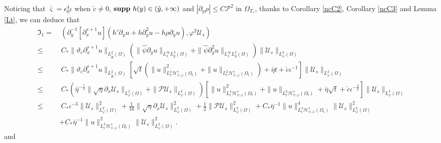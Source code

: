 \documentclass{amsart}
\numberwithin{equation}{section}
\begin{document}
Noticing that $\bar{\varsigma}=\epsilon_{0}^{4}\iota$ when $\check{c}\neq0$, ${\bf supp}~h(y)\in(\hat{y},+\infty)$ and $|\partial_{y}\rho|\leq C\mathcal{P}^{2}$  in $\Omega_{T_{*}}$, thanks to Corollary \ref{ncC2}, Corollary \ref{ncC3} and Lemma \ref{Lt}, we can deduce that
\begin{align*}
\mathfrak{I}_{1}
=&~(\partial_{y}^{-1}[\partial_{x}^{s+1}u](h'\partial_{y}u+h\partial_{y}^{2}u-h\rho\partial_{y}u),\varphi^{2}\mathcal{U}_{s})\\
\leq&~C_{*}\|\vartheta_{c}\partial_{x}^{s+1}u\|_{L_{\hat{\Psi}}^{2}(\Omega)}
           (\|\hat{\psi}\partial_{y}u\|_{L_{x}^{\infty}L_{y}^{2}(\Omega)}+\|\hat{\psi}\partial_{y}^{2}u\|_{L_{x}^{\infty}L_{y}^{2}(\Omega)})
           \|\mathcal{U}_{s}\|_{L_{\varphi}^{2}(\Omega)}\\
\leq&~C_{*}\|\vartheta_{c}\partial_{x}^{s+1}u\|_{L_{\hat{\Psi}}^{2}(\Omega)}
           \left[\sqrt{t}\left(\|u\|_{L_{t}^{4}\mathcal{H}_{\psi,\varphi}^{s}(\Omega_{t})}^{2}+\|u\|_{L_{t}^{2}\mathcal{H}_{\psi,\varphi}^{s}(\Omega_{t})}\right)
                 +\bar{\eta}t+\check{c}\iota^{-1}\right]
           \|\mathcal{U}_{s}\|_{L_{\varphi}^{2}(\Omega)}\\
\leq&~C_{*}\left(\bar{\eta}^{-\frac{1}{2}}\|\sqrt{\eta}\partial_{x}\mathcal{U}_{s}\|_{L_{\varphi}^{2}(\Omega)}+\|\mathcal{P}\mathcal{U}_{s}\|_{L_{\varphi}^{2}(\Omega)}\right)
           \left[\|u\|_{L_{t}^{4}\mathcal{H}_{\psi,\varphi}^{s}(\Omega_{t})}^{2}+\|u\|_{L_{t}^{2}\mathcal{H}_{\psi,\varphi}^{s}(\Omega_{t})}
                 +\bar{\eta}\sqrt{t}+\check{c}\iota^{-\frac{3}{2}}\right]
           \|\mathcal{U}_{s}\|_{L_{\varphi}^{2}(\Omega)}\\
\leq&~C_{*}\iota^{-3}\|\mathcal{U}_{s}\|_{L_{\varphi}^{2}(\Omega)}^{2}
     +\frac{1}{16}\|\sqrt{\eta}\partial_{x}\mathcal{U}_{s}\|_{L_{\varphi}^{2}(\Omega)}^{2}
     +\frac{1}{2}\|\mathcal{P}\mathcal{U}_{s}\|_{L_{\varphi}^{2}(\Omega)}^{2}
     +C_{*}\bar{\eta}^{-1}\|u\|_{L_{t}^{4}\mathcal{H}_{\psi,\varphi}^{s}(\Omega_{t})}^{4}\|\mathcal{U}_{s}\|_{L_{\varphi}^{2}(\Omega)}^{2}\\
    &+C_{*}\bar{\eta}^{-1}\|u\|_{L_{t}^{2}\mathcal{H}_{\psi,\varphi}^{s}(\Omega_{t})}^{2}\|\mathcal{U}_{s}\|_{L_{\varphi}^{2}(\Omega)}^{2}.
\end{align*}
and
\end{document}
